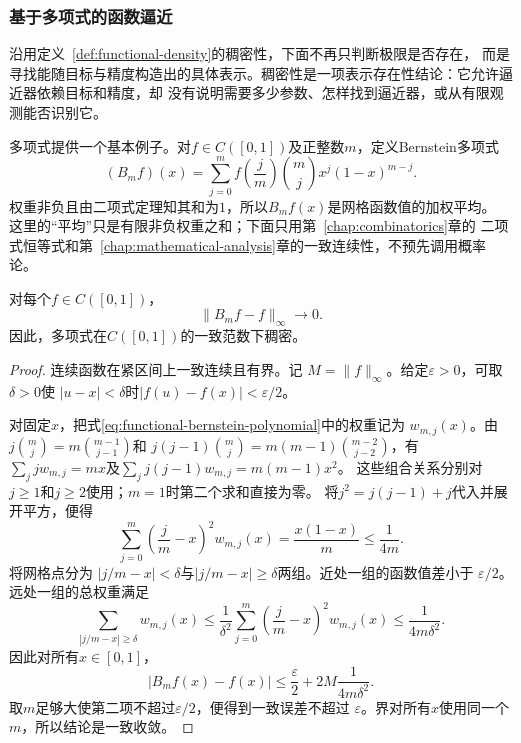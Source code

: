 \subsubsection{基于多项式的函数逼近}
\label{sec:functional-polynomial-approximation}

沿用定义~\ref{def:functional-density}的稠密性，下面不再只判断极限是否存在，
而是寻找能随目标与精度构造出的具体表示。稠密性是一项表示存在性结论：它允许逼近器依赖目标和精度，却
没有说明需要多少参数、怎样找到逼近器，或从有限观测能否识别它。

多项式提供一个基本例子。对$f\in C([0,1])$及正整数$m$，定义Bernstein多项式
\begin{equation}
  (B_mf)(x)
  =
  \sum_{j=0}^{m}
  f\left(\frac{j}{m}\right)
\binom{m}{j}x^j(1-x)^{m-j}.
  \label{eq:functional-bernstein-polynomial}
\end{equation}
权重非负且由二项式定理知其和为$1$，所以$B_mf(x)$是网格函数值的加权平均。
这里的“平均”只是有限非负权重之和；下面只用第~\ref{chap:combinatorics}章的
二项式恒等式和第~\ref{chap:mathematical-analysis}章的一致连续性，不预先调用概率论。

\begin{theorem}[Bernstein逼近定理]
\label{thm:functional-weierstrass-bernstein}
对每个$f\in C([0,1])$，
\[
  \lVert B_mf-f\rVert_{\infty}\longrightarrow0.
\]
因此，多项式在$C([0,1])$的一致范数下稠密。
\end{theorem}

\begin{proof}
连续函数在紧区间上一致连续且有界。记
$M=\lVert f\rVert_{\infty}$。给定$\varepsilon>0$，可取$\delta>0$使
$|u-x|<\delta$时$|f(u)-f(x)|<\varepsilon/2$。

对固定$x$，把式\eqref{eq:functional-bernstein-polynomial}中的权重记为
$w_{m,j}(x)$。由$j\binom mj=m\binom{m-1}{j-1}$和
$j(j-1)\binom mj=m(m-1)\binom{m-2}{j-2}$，有
$\sum_jj w_{m,j}=mx$及$\sum_jj(j-1)w_{m,j}=m(m-1)x^2$。
这些组合关系分别对$j\geq1$和$j\geq2$使用；$m=1$时第二个求和直接为零。
将$j^2=j(j-1)+j$代入并展开平方，便得
\[
  \sum_{j=0}^{m}
  \left(\frac{j}{m}-x\right)^2w_{m,j}(x)
  =
  \frac{x(1-x)}{m}
  \leq\frac{1}{4m}.
\]
将网格点分为
$|j/m-x|<\delta$与$|j/m-x|\geq\delta$两组。近处一组的函数值差小于
$\varepsilon/2$。远处一组的总权重满足
\[
  \sum_{|j/m-x|\geq\delta}w_{m,j}(x)
  \leq
  \frac{1}{\delta^2}
  \sum_{j=0}^{m}
  \left(\frac{j}{m}-x\right)^2w_{m,j}(x)
  \leq\frac{1}{4m\delta^2}.
\]
因此对所有$x\in[0,1]$，
\[
  |B_mf(x)-f(x)|
  \leq
  \frac{\varepsilon}{2}
  +
  2M\frac{1}{4m\delta^2}.
\]
取$m$足够大使第二项不超过$\varepsilon/2$，便得到一致误差不超过
$\varepsilon$。界对所有$x$使用同一个$m$，所以结论是一致收敛。
\end{proof}

